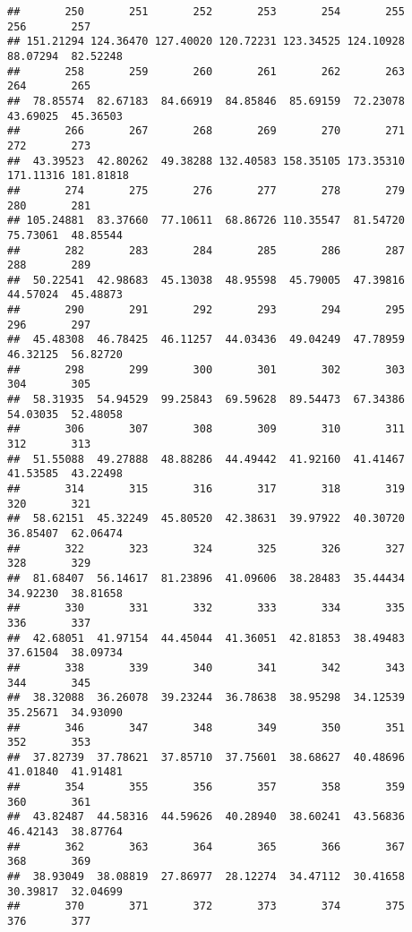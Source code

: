 \documentclass[
]{article}
\begin{document}
\begin{verbatim}
##       250       251       252       253       254       255       256       257 
## 151.21294 124.36470 127.40020 120.72231 123.34525 124.10928  88.07294  82.52248 
##       258       259       260       261       262       263       264       265 
##  78.85574  82.67183  84.66919  84.85846  85.69159  72.23078  43.69025  45.36503 
##       266       267       268       269       270       271       272       273 
##  43.39523  42.80262  49.38288 132.40583 158.35105 173.35310 171.11316 181.81818 
##       274       275       276       277       278       279       280       281 
## 105.24881  83.37660  77.10611  68.86726 110.35547  81.54720  75.73061  48.85544 
##       282       283       284       285       286       287       288       289 
##  50.22541  42.98683  45.13038  48.95598  45.79005  47.39816  44.57024  45.48873 
##       290       291       292       293       294       295       296       297 
##  45.48308  46.78425  46.11257  44.03436  49.04249  47.78959  46.32125  56.82720 
##       298       299       300       301       302       303       304       305 
##  58.31935  54.94529  99.25843  69.59628  89.54473  67.34386  54.03035  52.48058 
##       306       307       308       309       310       311       312       313 
##  51.55088  49.27888  48.88286  44.49442  41.92160  41.41467  41.53585  43.22498 
##       314       315       316       317       318       319       320       321 
##  58.62151  45.32249  45.80520  42.38631  39.97922  40.30720  36.85407  62.06474 
##       322       323       324       325       326       327       328       329 
##  81.68407  56.14617  81.23896  41.09606  38.28483  35.44434  34.92230  38.81658 
##       330       331       332       333       334       335       336       337 
##  42.68051  41.97154  44.45044  41.36051  42.81853  38.49483  37.61504  38.09734 
##       338       339       340       341       342       343       344       345 
##  38.32088  36.26078  39.23244  36.78638  38.95298  34.12539  35.25671  34.93090 
##       346       347       348       349       350       351       352       353 
##  37.82739  37.78621  37.85710  37.75601  38.68627  40.48696  41.01840  41.91481 
##       354       355       356       357       358       359       360       361 
##  43.82487  44.58316  44.59626  40.28940  38.60241  43.56836  46.42143  38.87764 
##       362       363       364       365       366       367       368       369 
##  38.93049  38.08819  27.86977  28.12274  34.47112  30.41658  30.39817  32.04699 
##       370       371       372       373       374       375       376       377 

\end{verbatim}
\end{document}
